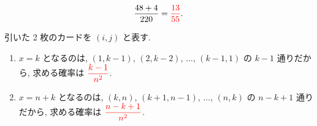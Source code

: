 \begin{qenumerate}
{\begin{enumerate}
{				\begin{align}
					\frac{48 + 4}{220} = \textcolor{red}{\frac{13}{55}}.
				\end{align}
			}
		\end{enumerate}
	}
	\item{
		引いた 2 枚のカードを $(i, j)$ と表す.
		\begin{enumerate}
			\item{
				$x = k$ となるのは, $(1, k - 1)$, $(2, k - 2)$, $\dots$, $(k - 1, 1)$ の $k - 1$ 通りだから, 求める確率は $\textcolor{red}{\dfrac{k - 1}{n^{2}}}$.
			}
			\item{
				$x = n + k$ となるのは, $(k, n)$, $(k + 1, n - 1)$, $\dots$, $(n, k)$ の $n - k + 1$ 通りだから, 求める確率は $\textcolor{red}{\dfrac{n - k + 1}{n^{2}}}$.
			}
		\end{enumerate}
	}
\end{qenumerate}
